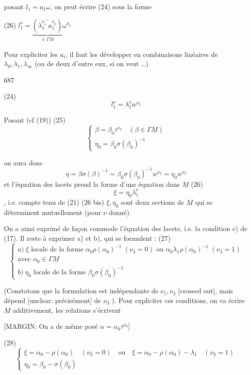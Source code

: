 posant $l_1 = a_1 \omega$, on peut écrire (24) sous la forme

(26) $l_1^\nu = \underbrace{(\lambda_1^{\underline{\nu}_1'} a_1^{\underline{\nu}_2})}_{\in \Gamma \underline{M}} \omega^{\underline{\nu}_2}$

Pour expliciter les $a_i$, il faut les développer en combinaisons linéaires de $\lambda_0, \lambda_1, \lambda_\infty$ (ou de deux d'entre eux, si on veut \dots).

\newpage


687

(24) $$l_1^\nu = \lambda_1^\nu w^{\nu_2}$$

Posant (cf (19))
(25) $$\begin{cases} \beta = \beta_0 \tau^{\nu_2} \quad (\beta \in \Gamma \underline{M}) \\ \eta_0 = \beta_0 \sigma(\beta_0)^{-1} \end{cases}$$

on aura donc
$$\eta = \beta \sigma(\beta)^{-1} = \beta_0 \sigma(\beta_0)^{-1} w^{\nu_2} = \eta_0 w^{\nu_2}$$
et l'équation des lacets prend la forme d'une équation dans $\underline{M}$
(26) $$\xi = \eta_0 \lambda_1^\nu$$ , i.e. compte tenu de (21)
(26 bis) $\xi, \eta_0$ sont deux sections de $\underline{M}$ qui se déterminent mutuellement (pour $\nu$ donné).

On a ainsi exprimé de façon commode l'équation des lacets, i.e. la condition c) de (17). Il reste à exprimer a) et b), qui se formulent :
(27) $$\begin{cases} a) \; \xi \text{ locale de la forme } \alpha_0 \rho(\alpha_0)^{-1} \; (\nu_3=0) \text{ ou } \alpha_0 \lambda_1 \rho(\alpha_0)^{-1} \; (\nu_3=1) \\ \text{avec } \alpha_0 \in \Gamma \underline{M} \\ b) \; \eta_0 \text{ locale de la forme } \beta_0 \sigma(\beta_0)^{-1} \end{cases}$$

(Constatons que la formulation est indépendante de $\nu_1, \nu_2$ [crossed out], mais dépend [unclear: précisément] de $\nu_3$ ). Pour expliciter ces conditions, on va écrire $\underline{M}$ additivement, les relations s'écrivent

[MARGIN: On a de même posé $\alpha = \alpha_0 \tau^{\nu_3}$]

(28) $$\begin{cases} \xi = \alpha_0 - \rho(\alpha_0) \quad (\nu_3=0) \quad \text{ou} \quad \xi = \alpha_0 - \rho(\alpha_0) - \lambda_1 \quad (\nu_3=1) \\ \eta_0 = \beta_0 - \sigma(\beta_0) \end{cases}$$

